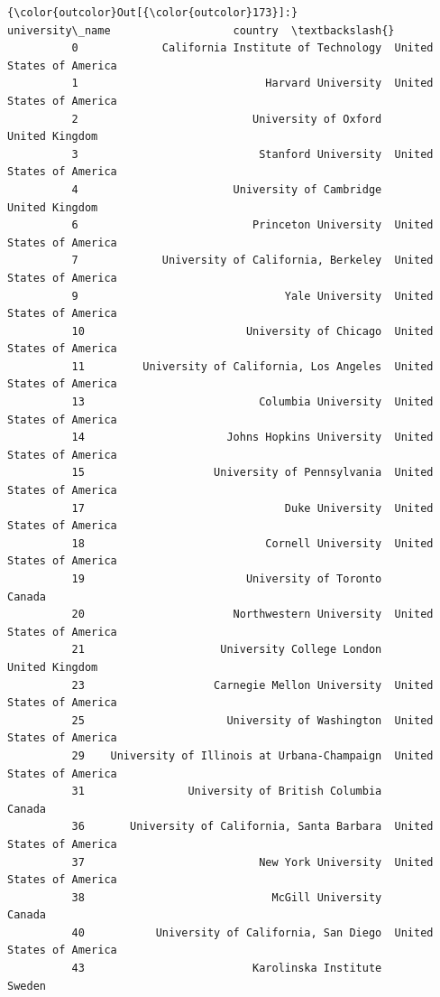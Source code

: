 \documentclass[11pt]{article}
\begin{document}
\begin{Verbatim}[commandchars=\\\{\}]
{\color{outcolor}Out[{\color{outcolor}173}]:}                                  university\_name                   country  \textbackslash{}
          0             California Institute of Technology  United States of America   
          1                             Harvard University  United States of America   
          2                           University of Oxford            United Kingdom   
          3                            Stanford University  United States of America   
          4                        University of Cambridge            United Kingdom   
          6                           Princeton University  United States of America   
          7             University of California, Berkeley  United States of America   
          9                                Yale University  United States of America   
          10                         University of Chicago  United States of America   
          11         University of California, Los Angeles  United States of America   
          13                           Columbia University  United States of America   
          14                      Johns Hopkins University  United States of America   
          15                    University of Pennsylvania  United States of America   
          17                               Duke University  United States of America   
          18                            Cornell University  United States of America   
          19                         University of Toronto                    Canada   
          20                       Northwestern University  United States of America   
          21                     University College London            United Kingdom   
          23                    Carnegie Mellon University  United States of America   
          25                      University of Washington  United States of America   
          29    University of Illinois at Urbana-Champaign  United States of America   
          31                University of British Columbia                    Canada   
          36       University of California, Santa Barbara  United States of America   
          37                           New York University  United States of America   
          38                             McGill University                    Canada   
          40           University of California, San Diego  United States of America   
          43                          Karolinska Institute                    Sweden   

\end{Verbatim}
\end{document}
